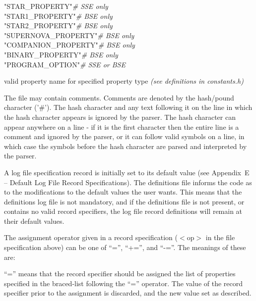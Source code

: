 \begin{minipage}{\dimexpr\textwidth-2em}
    \rab\tabto{7em}{::=}\tabto{9em}"STAR\_PROPERTY"\tabto{23em}\textbar\tabto{28em}\textit{\# SSE only} \\
    \tabto{9em}"STAR1\_PROPERTY"\tabto{23em}\textbar\tabto{28em}\textit{\# BSE only} \\
    \tabto{9em}"STAR2\_PROPERTY"\tabto{23em}\textbar\tabto{28em}\textit{\# BSE only} \\
    \tabto{9em}"SUPERNOVA\_PROPERTY"\tabto{23em}\textbar\tabto{28em}\textit{\# BSE only} \\
    \tabto{9em}"COMPANION\_PROPERTY"\tabto{23em}\textbar\tabto{28em}\textit{\# BSE only} \\
    \tabto{9em}"BINARY\_PROPERTY"\tabto{23em}\textbar\tabto{28em}\textit{\# BSE only} \\
    \tabto{9em}"PROGRAM\_OPTION"\tabto{23em}\textbar\tabto{28em}\textit{\# SSE or BSE}

    \rab\tabto{7em}{::=}\tabto{9em}valid property name for specified property type \textit{(see definitions in constants.h)}
\end{minipage}

\newpage
The file may contain comments. Comments are denoted by the hash/pound character ('\#'). The hash character and any text following it on the line in which the hash character appears is ignored by the parser. The hash character can appear anywhere on a line - if it is the first character then the entire line is a comment and ignored by the parser, or it can follow valid symbols on a line, in which case the symbols before the hash character are parsed and interpreted by the parser.

A log file specification record is initially set to its default value (see Appendix~E -- Default Log File Record Specifications). The definitions file informs the code as to the modifications to the default values the user wants. This means that the definitions log file is not mandatory, and if the definitions file is not present, or contains no valid record specifiers, the log file record definitions will remain at their default values.

The assignment operator given in a record specification ($\mathrm{<}$op$\mathrm{>}$ in the file specification above) can be one of ``='', ``+='', and ``-=''.  The meanings of these are:

\bigskip
\hfill
\begin{minipage}{\dimexpr\textwidth-1.5cm}
``='' means that the record specifier should be assigned the list of properties specified in the braced-list following the ``='' operator. The value of the record specifier prior to the assignment is discarded, and the new value set as described.
\end{minipage}

